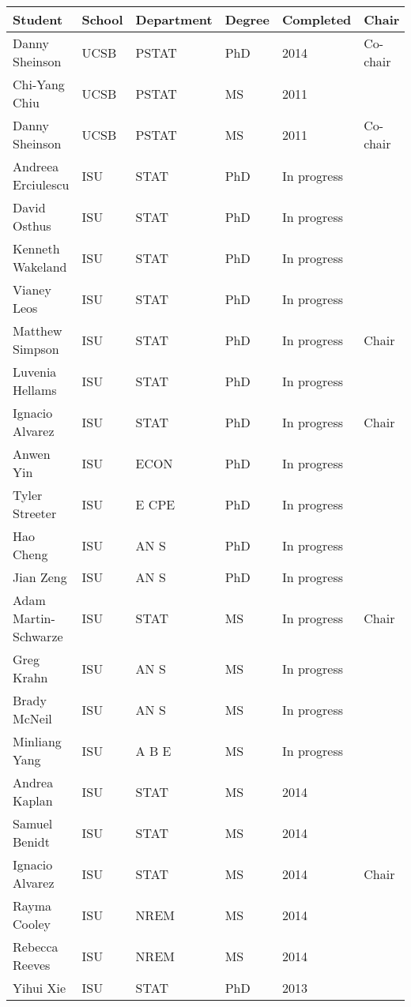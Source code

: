 \begin{table}[h]
\centering
\begin{tabular}{llllll}
  \hline
Student & School & Department & Degree & Completed & Chair \\ 
  \hline
Danny Sheinson & UCSB & PSTAT & PhD & 2014 & Co-chair \\ 
  Chi-Yang Chiu & UCSB & PSTAT & MS & 2011 &  \\ 
  Danny Sheinson & UCSB & PSTAT & MS & 2011 & Co-chair \\ 
  Andreea Erciulescu & ISU & STAT & PhD & In progress &  \\ 
  David Osthus & ISU & STAT & PhD & In progress &  \\ 
  Kenneth Wakeland & ISU & STAT & PhD & In progress &  \\ 
  Vianey Leos & ISU & STAT & PhD & In progress &  \\ 
  Matthew Simpson & ISU & STAT & PhD & In progress & Chair \\ 
  Luvenia Hellams & ISU & STAT & PhD & In progress &  \\ 
  Ignacio Alvarez & ISU & STAT & PhD & In progress & Chair \\ 
  Anwen Yin & ISU & ECON & PhD & In progress &  \\ 
  Tyler Streeter & ISU & E CPE & PhD & In progress &  \\ 
  Hao Cheng & ISU & AN S & PhD & In progress &  \\ 
  Jian Zeng & ISU & AN S & PhD & In progress &  \\ 
  Adam Martin-Schwarze & ISU & STAT & MS & In progress & Chair \\ 
  Greg Krahn & ISU & AN S & MS & In progress &  \\ 
  Brady McNeil & ISU & AN S & MS & In progress &  \\ 
  Minliang Yang & ISU & A B E & MS & In progress &  \\ 
  Andrea Kaplan & ISU & STAT & MS & 2014 &  \\ 
  Samuel Benidt & ISU & STAT & MS & 2014 &  \\ 
  Ignacio Alvarez & ISU & STAT & MS & 2014 & Chair \\ 
  Rayma Cooley & ISU & NREM & MS & 2014 &  \\ 
  Rebecca Reeves & ISU & NREM & MS & 2014 &  \\ 
  Yihui Xie & ISU & STAT & PhD & 2013 &  \\ 

\end{tabular}
\end{table}
